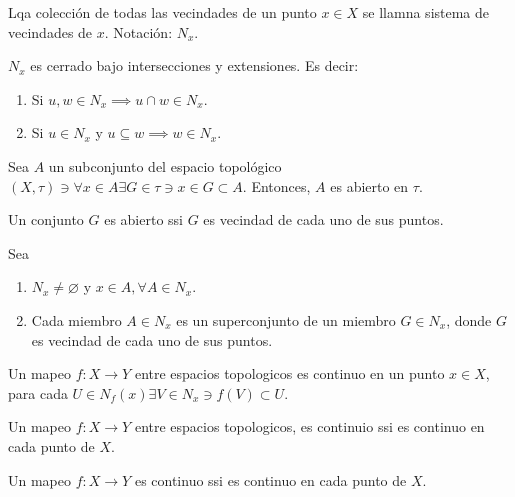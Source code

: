 \begin{definicion}
    Lqa colección de todas las vecindades de un punto $x\in X$ se llamna sistema de vecindades de $x$. Notación: $N_x$. 
\end{definicion}


\begin{prop}
    $N_x$ es cerrado bajo intersecciones y extensiones. Es decir: 
    \begin{enumerate}
        \item Si $u,w\in N_x\implies u\cap w\in N_x$.
        \item Si $u\in N_x$ y $u\subseteq w \implies w\in N_x$. 
    \end{enumerate}
\end{prop}


\begin{prop}
    Sea $A$ un subconjunto del espacio topológico $(X,\tau)\ni \forall x\in A\exists G\in\tau\ni x\in G\subset A$. Entonces, $A$ es abierto en $\tau$. 
\end{prop}


\begin{prop}
    Un conjunto $G$ es abierto ssi $G$ es vecindad de cada uno de sus puntos. 
    
\end{prop}



\begin{prop}
    Sea 
    \begin{enumerate}
        \item $N_x\neq \varnothing$ y $x\in A,\forall A\in N_x$. 
        \item Cada miembro $A\in N_x$ es un superconjunto de un miembro $G\in N_x$, donde $G$ es vecindad de cada uno de sus puntos. 
    \end{enumerate}
\end{prop}


\begin{definicion}
    Un mapeo $f:X\to Y$ entre espacios topologicos es continuo en un punto $x\in X$, para cada $U\in N_f(x)\exists V\in N_x\ni f(V)\subset U$. 
\end{definicion}

\begin{teorema}
    Un mapeo $f:X\to Y$ entre espacios topologicos, es continuio ssi es continuo en cada punto de $X$. 
\end{teorema}


\begin{teorema}
    Un mapeo $f:X\to Y$ es continuo ssi es continuo en cada punto de $X$. 
\end{teorema}



